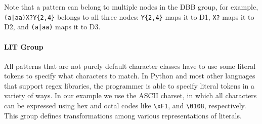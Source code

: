 \begin{description}

\end{description}

Note that a pattern can belong to multiple nodes in the DBB group, for example, \verb!(a|aa)X?Y{2,4}! belongs to all three nodes: \verb!Y{2,4}! maps it to D1, \verb!X?!  maps it to D2, and \verb!(a|aa)!  maps it to D3.




\paragraph{LIT Group}
All patterns that are not purely default character classes have to use some literal tokens to specify what characters to match.  In Python and most other languages that support regex libraries, the programmer is able to specify literal tokens in a variety of ways.  In our example we use the ASCII charset, in which all characters can be expressed using hex and octal codes like \verb!\xF1!, and \verb!\0108!, respectively.  This group defines transformations among various representations of literals.


